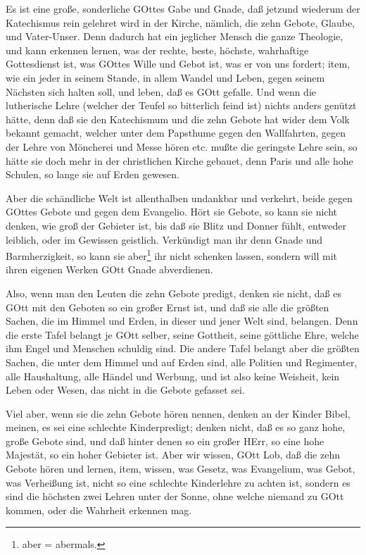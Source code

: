 Es ist eine große, sonderliche GOttes Gabe und Gnade, daß jetzund wiederum der Katechismus rein gelehret wird in der Kirche, nämlich, die zehn Gebote, Glaube, und Vater-Unser. Denn dadurch hat ein jeglicher Mensch die ganze Theologie, und kann erkennen lernen, was der rechte, beste, höchste, wahrhaftige Gottesdienst ist, was GOttes Wille und Gebot ist, was er von uns fordert; item, wie ein jeder in seinem Stande, in allem Wandel und Leben, gegen seinem Nächsten sich halten soll, und leben, daß es GOtt gefalle. Und wenn die lutherische Lehre (welcher der Teufel so bitterlich feind ist) nichts anders genützt hätte, denn daß sie den Katechismum und die zehn Gebote hat wider dem Volk bekannt gemacht, welcher unter dem Papsthume gegen den Wallfahrten, gegen der Lehre von Möncherei und Messe hören etc. mußte die geringste Lehre sein, so hätte sie doch mehr in der christlichen Kirche gebauet, denn Paris und alle hohe Schulen, so lange sie auf Erden gewesen.

Aber die schändliche Welt ist allenthalben undankbar und verkehrt, beide gegen GOttes Gebote und gegen dem Evangelio. Hört sie Gebote, so kann sie nicht denken, wie groß der Gebieter ist, bis daß sie Blitz und Donner fühlt, entweder leiblich, oder im Gewissen geistlich. Verkündigt man ihr denn Gnade und Barmherzigkeit, so kann sie aber\footnote{aber = abermals.} ihr nicht schenken lassen, sondern will mit ihren eigenen Werken GOtt Gnade abverdienen.

Also, wenn man den Leuten die zehn Gebote predigt, denken sie nicht, daß es GOtt mit den Geboten so ein großer Ernst ist, und daß sie alle die größten Sachen, die im Himmel und Erden, in dieser und jener Welt sind, belangen. Denn die erste Tafel belangt je GOtt selber, seine Gottheit, seine göttliche Ehre, welche ihm Engel und Menschen schuldig sind. Die andere Tafel belangt aber die größten Sachen, die unter dem Himmel und auf Erden sind, alle Politien und Regimenter, alle
Haushaltung, alle Händel und Werbung, und ist also keine Weisheit, kein Leben oder Wesen, das nicht in die Gebote gefasset sei.

Viel aber, wenn sie die zehn Gebote hören nennen, denken an der Kinder Bibel, meinen, es sei eine schlechte Kinderpredigt; denken nicht, daß es so ganz hohe, große Gebote sind, und daß hinter denen so ein großer HErr, so eine hohe Majestät, so ein hoher Gebieter ist. Aber wir wissen, GOtt Lob, daß die zehn Gebote hören und lernen, item, wissen, was Gesetz, was Evangelium, was Gebot, was Verheißung ist, nicht so eine schlechte Kinderlehre zu achten ist, sondern es sind die höchsten zwei Lehren unter der Sonne, ohne welche niemand zu GOtt kommen, oder die Wahrheit erkennen mag.

